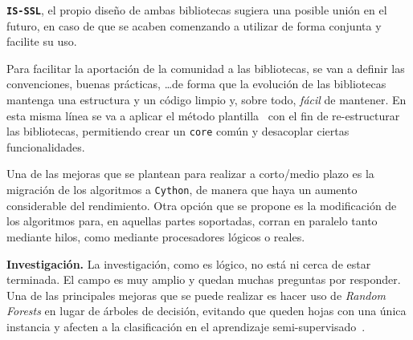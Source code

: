 \textbf{\texttt{IS-SSL}}, el propio diseño de ambas bibliotecas sugiera una posible unión en el futuro, en caso de que se acaben comenzando a utilizar de forma conjunta y facilite su uso. 

Para facilitar la aportación de la comunidad a las bibliotecas, se van a definir las convenciones, buenas prácticas, \ldots de forma que la evolución de las bibliotecas mantenga una estructura y un código limpio y, sobre todo, \emph{fácil} de mantener. En esta misma línea se va a aplicar el método plantilla~\cite{shvets2021} con el fin de re-estructurar las bibliotecas, permitiendo crear un \texttt{core} común y desacoplar ciertas funcionalidades.

Una de las mejoras que se plantean para realizar a corto/medio plazo es la migración de los algoritmos a \texttt{Cython}, de manera que haya un aumento considerable del rendimiento. Otra opción que se propone es la modificación de los algoritmos para, en aquellas partes soportadas, corran en paralelo tanto mediante hilos, como mediante procesadores lógicos o reales.

\textbf{Investigación.} La investigación, como es lógico, no está ni cerca de estar terminada. El campo es muy amplio y quedan muchas preguntas por responder. Una de las principales mejoras que se puede realizar es hacer uso de \textit{Random Forests} en lugar de árboles de decisión, evitando que queden hojas con una única instancia y afecten a la clasificación en el aprendizaje semi-supervisado~\cite{tanha2017semi}.

